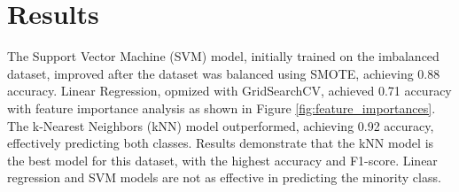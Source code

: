 \section{Results}

The Support Vector Machine (SVM) model, initially trained on the imbalanced dataset, improved after the dataset was balanced using SMOTE, achieving 0.88 accuracy. Linear Regression,
opmized with GridSearchCV, achieved 0.71 accuracy with feature importance analysis as shown in Figure \ref{fig:feature_importances}. The k-Nearest Neighbors (kNN) model outperformed,
achieving 0.92 accuracy, effectively predicting both classes. Results demonstrate that the kNN model is the best model for this dataset, with the highest accuracy and F1-score. 
Linear regression and SVM models are not as effective in predicting the minority class.

